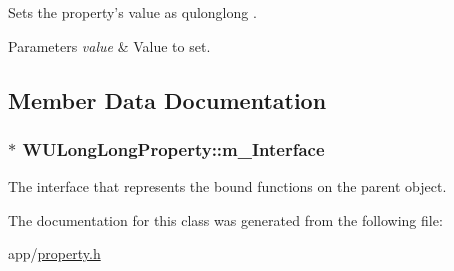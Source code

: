 Sets the property's value as qulonglong . 


\begin{DoxyParams}{Parameters}
{\em value} & Value to set. \\
\hline
\end{DoxyParams}


\subsection{Member Data Documentation}
\hypertarget{class_w_u_long_long_property_af84b2abd75425a2173ed9450c2a65ce6}{
\subsubsection[{m\-\_\-\-Interface}]{$\ast$ W\-U\-Long\-Long\-Property\-::m\-\_\-\-Interface\hspace{0.3cm}{\ttfamily [protected]}}}\label{class_w_u_long_long_property_af84b2abd75425a2173ed9450c2a65ce6}
The interface that represents the bound functions on the parent object. 

The documentation for this class was generated from the following file\-:\begin{DoxyCompactItemize}
\item 
app/\hyperlink{property_8h}{property.\-h}\end{DoxyCompactItemize}
